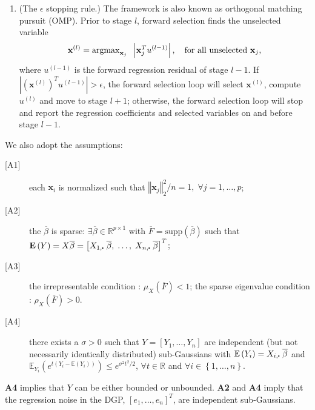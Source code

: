 \documentclass[11pt,review,authoryear]{elsarticle}
\begin{document}
\begin{appendices}
\begin{enumerate}
  \item (The $\epsilon$ stopping rule.) The \citet[Figure~1]{zhang09} framework is also known as orthogonal matching pursuit (OMP). Prior to stage $l$, forward selection finds the unselected variable
  \begin{displaymath}
    \mathbf{x}^{(l)} = \mathrm{argmax}_{\mathbf{x}_j} \;\; \left\vert \mathbf{x}_j^T u^{(l-1)} \right\vert, \\
    \quad\mbox{for all unselected }\mathbf{x}_{j},
  \end{displaymath}
  where $u^{\left(l-1\right)}$ is the forward regression residual of stage $l-1$. If $\left\vert (\mathbf{x}^{(l)})^T u^{(l-1)} \right\vert > \epsilon$, the forward selection loop will select $\mathbf{x}^{(l)}$, compute $u^{(l)}$ and move to stage $l+1$; otherwise, the forward selection loop will stop and report the regression coefficients and selected variables on and before stage $l-1$.
\end{enumerate}

We also adopt the \citet{zhang09} assumptions:
%
\begin{description}
  \item [{[}A1{]}] each $\mathbf{x}_i$ is normalized such that $\left\Vert \mathbf{x}_{j}\right\Vert _{2}^{2}/n=1,\;\forall j=1,\ldots,p$;
  \item [{[}A2{]}] the $\overline{\beta}$ is sparse: $\exists \overline{\beta} \in \mathbb{R}^{p\times 1}$ with $\overline{F} = \mathrm{supp} \left( \overline{\beta} \right)$ such that $ \mathbf{E} \left( Y \right) = X\overline{\beta} = \left[ X_{1,\bigcdot} \; \overline{\beta}, \;  \ldots, \; X_{n,\bigcdot} \; \overline{\beta} \right]^T$;
  \item [{[}A3{]}] the irrepresentable condition \citep{tropp2004greed}: $\mu_{X}\left(\overline{F}\right)<1$; the sparse eigenvalue condition \citep{wainwright2009sharp}: $\rho_{X}\left(\overline{F}\right)>0$.
  \item [{[}A4{]}] there exists a $ \sigma > 0$ such that $Y = \left[ Y_1, \ldots, Y_n \right]$ are independent (but not necessarily identically distributed) sub-Gaussians with $\mathbb{E} \left(Y_i\right)=  X_{i,\bigcdot} \; \overline{\beta}$ and $\mathbb{E}_{Y_i} \left( e^{t\left(Y_i - \mathbb{E} \left( Y_i \right) \right)}\right) \leqslant e^{\sigma^2t^2/2}$, $\forall t\in \mathbb{R}$ and $\forall i\in \left\{1,\ldots,n\right\}$.
\end{description}

\textbf{A4} implies that $Y$ can be either bounded or unbounded. \textbf{A2} and \textbf{A4} imply that the regression noise in the DGP, $\left[e_1, \ldots, e_n\right]^T$, are independent sub-Gaussians.


\end{appendices}
\end{document}
